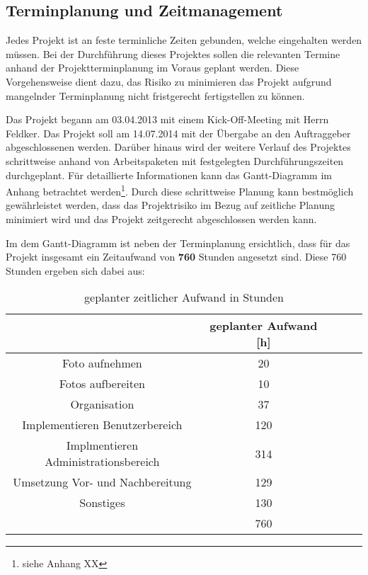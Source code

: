 \subsection{Terminplanung und Zeitmanagement}
\label{sec:TerminplanungUndZeitManagement}

Jedes Projekt ist an feste terminliche Zeiten gebunden, welche eingehalten werden müssen. Bei der Durchführung dieses 
Projektes sollen die relevanten Termine anhand der Projektterminplanung im Voraus geplant werden. Diese Vorgehensweise 
dient dazu, das Risiko zu minimieren das Projekt aufgrund mangelnder Terminplanung nicht fristgerecht fertigstellen zu 
können.

Das Projekt begann am 03.04.2013 mit einem Kick-Off-Meeting mit Herrn Feldker. Das Projekt 
soll am 14.07.2014 mit der Übergabe an den Auftraggeber abgeschlossenen werden. Darüber hinaus wird 
der weitere Verlauf des Projektes schrittweise anhand von 
Arbeitspaketen mit festgelegten Durchführungszeiten durchgeplant. Für detaillierte Informationen kann das Gantt-Diagramm 
im Anhang betrachtet werden\footnote{siehe Anhang XX}.
Durch diese schrittweise Planung kann bestmöglich gewährleistet werden, dass das  Projektrisiko im Bezug auf zeitliche 
Planung minimiert wird und das Projekt zeitgerecht abgeschlossen werden kann.

Im dem Gantt-Diagramm ist neben der Terminplanung ersichtlich, dass für das Projekt insgesamt ein Zeitaufwand von
\textbf{760} Stunden angesetzt sind. Diese 760 Stunden ergeben sich dabei aus:

\begin{table}[h]
\centering
\begin{tabular}{ccccl}
\hline
\multicolumn{1}{l}{}                 & geplanter Aufwand {[}h{]}  \\ \hline
Foto aufnehmen                       & 20                         \\ \hline
Fotos aufbereiten                    & 10                         \\ \hline
Organisation                         & 37                         \\ \hline
Implementieren Benutzerbereich       & 120                        \\ \hline
Implmentieren Administrationsbereich & 314                        \\ \hline
Umsetzung Vor- und Nachbereitung     & 129                        \\ \hline
Sonstiges                            & 130                        \\ \hline
                                     & 760                        \\ \hline
\end{tabular}
\caption{geplanter zeitlicher Aufwand in Stunden}%
\label{tab:geplanterAufwand}%
\end{table}